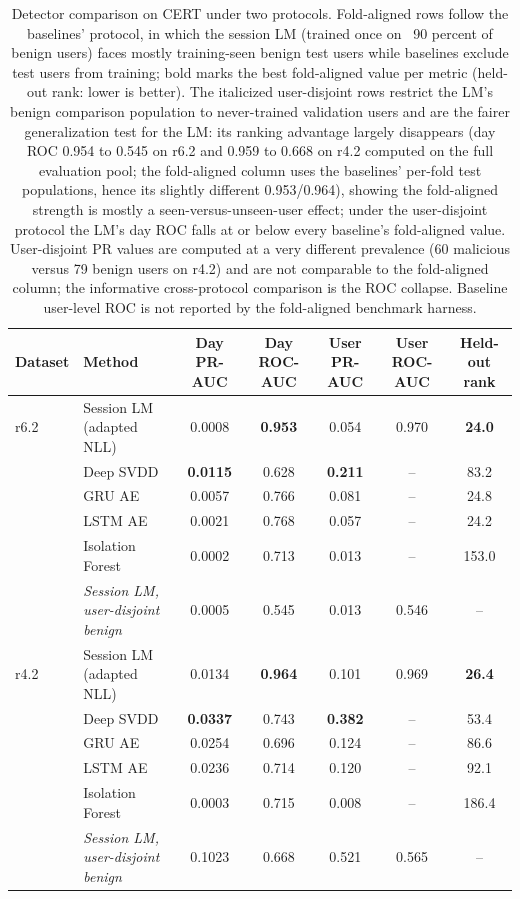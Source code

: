 \begin{table}[htbp]
\caption{Detector comparison on CERT under two protocols. Fold-aligned rows follow the baselines' protocol, in which the session LM (trained once on ~90 percent of benign users) faces mostly training-seen benign test users while baselines exclude test users from training; bold marks the best fold-aligned value per metric (held-out rank: lower is better). The italicized user-disjoint rows restrict the LM's benign comparison population to never-trained validation users and are the fairer generalization test for the LM: its ranking advantage largely disappears (day ROC 0.954 to 0.545 on r6.2 and 0.959 to 0.668 on r4.2 computed on the full evaluation pool; the fold-aligned column uses the baselines' per-fold test populations, hence its slightly different 0.953/0.964), showing the fold-aligned strength is mostly a seen-versus-unseen-user effect; under the user-disjoint protocol the LM's day ROC falls at or below every baseline's fold-aligned value. User-disjoint PR values are computed at a very different prevalence (60 malicious versus 79 benign users on r4.2) and are not comparable to the fold-aligned column; the informative cross-protocol comparison is the ROC collapse. Baseline user-level ROC is not reported by the fold-aligned benchmark harness.}
\label{tab:cert_detector}
\centering
\footnotesize
\setlength{\tabcolsep}{3pt}
\begin{tabular}{llccccc}
\toprule
Dataset & Method & Day PR-AUC & Day ROC-AUC & User PR-AUC & User ROC-AUC & Held-out rank \\
\midrule
r6.2 & Session LM (adapted NLL) & 0.0008 & \textbf{0.953} & 0.054 & 0.970 & \textbf{24.0} \\
 & Deep SVDD & \textbf{0.0115} & 0.628 & \textbf{0.211} & -- & 83.2 \\
 & GRU AE & 0.0057 & 0.766 & 0.081 & -- & 24.8 \\
 & LSTM AE & 0.0021 & 0.768 & 0.057 & -- & 24.2 \\
 & Isolation Forest & 0.0002 & 0.713 & 0.013 & -- & 153.0 \\
 & \emph{Session LM, user-disjoint benign} & 0.0005 & 0.545 & 0.013 & 0.546 & -- \\
\midrule
r4.2 & Session LM (adapted NLL) & 0.0134 & \textbf{0.964} & 0.101 & 0.969 & \textbf{26.4} \\
 & Deep SVDD & \textbf{0.0337} & 0.743 & \textbf{0.382} & -- & 53.4 \\
 & GRU AE & 0.0254 & 0.696 & 0.124 & -- & 86.6 \\
 & LSTM AE & 0.0236 & 0.714 & 0.120 & -- & 92.1 \\
 & Isolation Forest & 0.0003 & 0.715 & 0.008 & -- & 186.4 \\
 & \emph{Session LM, user-disjoint benign} & 0.1023 & 0.668 & 0.521 & 0.565 & -- \\
\bottomrule
\end{tabular}
\end{table}
